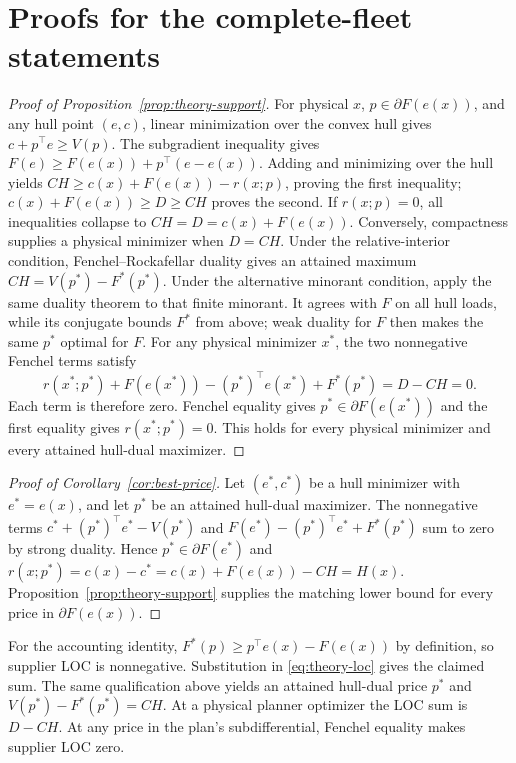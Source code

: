 \section{Proofs for the complete-fleet statements}\label{app:theory-proofs}

\begin{proof}[Proof of Proposition~\ref{prop:theory-support}]
For physical $x$, $p\in\partial F(e(x))$, and any hull point $(e,c)$,
linear minimization over the convex hull gives
$c+p^\top e\geq V(p)$.  The subgradient inequality gives
$F(e)\geq F(e(x))+p^\top(e-e(x))$.  Adding and minimizing over the hull
yields $CH\geq c(x)+F(e(x))-r(x;p)$, proving the first inequality;
$c(x)+F(e(x))\geq D\geq CH$ proves the second.  If $r(x;p)=0$, all
inequalities collapse to $CH=D=c(x)+F(e(x))$.  Conversely, compactness
supplies a physical minimizer when $D=CH$.  Under the relative-interior
condition, Fenchel--Rockafellar duality gives an attained maximum
$CH=V(p^*)-F^*(p^*)$.  Under the alternative minorant condition, apply
the same duality theorem to that finite minorant.  It agrees with $F$
on all hull loads, while its conjugate bounds $F^*$ from above; weak
duality for $F$ then makes the same $p^*$ optimal for $F$.  For any
physical minimizer $x^*$, the two
nonnegative Fenchel terms satisfy
\[
r(x^*;p^*)+
F(e(x^*))-(p^*)^\top e(x^*)+F^*(p^*)
=D-CH=0.
\]
Each term is therefore zero.  Fenchel equality gives
$p^*\in\partial F(e(x^*))$ and the first equality gives
$r(x^*;p^*)=0$.  This holds for every physical minimizer and every
attained hull-dual maximizer.
\end{proof}

\begin{proof}[Proof of Corollary~\ref{cor:best-price}]
Let $(e^*,c^*)$ be a hull minimizer with $e^*=e(x)$, and let $p^*$ be an
attained hull-dual maximizer. The nonnegative terms
$c^*+(p^*)^\top e^*-V(p^*)$ and
$F(e^*)-(p^*)^\top e^*+F^*(p^*)$ sum to zero by strong duality.
Hence $p^*\in\partial F(e^*)$ and
$r(x;p^*)=c(x)-c^*=c(x)+F(e(x))-CH=H(x)$.
Proposition~\ref{prop:theory-support} supplies the matching lower bound
for every price in $\partial F(e(x))$.
\end{proof}

For the accounting identity, $F^*(p)\geq p^\top e(x)-F(e(x))$ by
definition, so supplier LOC is nonnegative.  Substitution in
\eqref{eq:theory-loc} gives the claimed sum.  The same
qualification above yields an attained hull-dual price
$p^*$ and $V(p^*)-F^*(p^*)=CH$.  At a physical planner optimizer the
LOC sum is $D-CH$.  At any price in the plan's subdifferential, Fenchel
equality makes supplier LOC zero.

